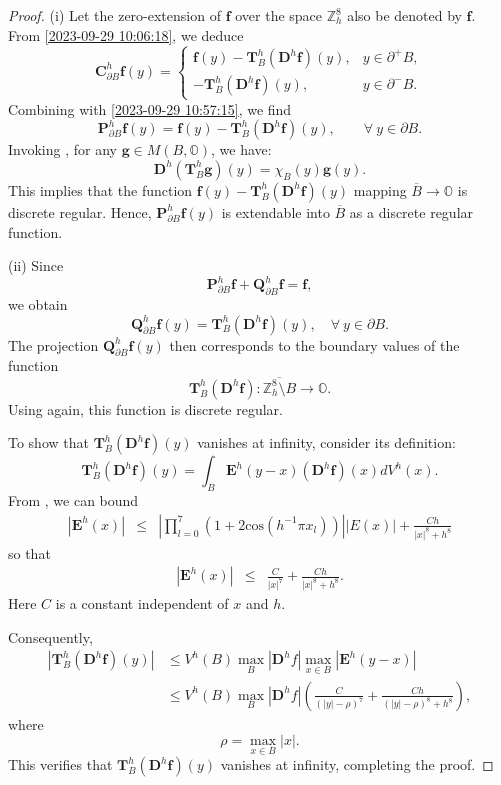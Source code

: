 \documentclass{amsart}
\theoremstyle{definition}
\theoremstyle{remark}
\numberwithin{equation}{section}
\newcommand{\p}{\partial}
\newcommand{\OO}{\mathbb O}
\newcommand{\Z}{\mathbb Z}
\newcommand{\f}{\bm{f}}
\newcommand{\g}{\bm{g}}
\newcommand{\E}{\bm{E}}
\begin{document}
\begin{proof}
(i) 	Let the zero-extension of $\f$ over the space $\Z^8_h$ also be denoted by $\f$. From \eqref{2023-09-29 10:06:18}, we deduce
	\[
	\bm C^h_{\p B}\f(y) =
	\begin{cases}
		\f(y)- \bm T^h_B(\bm D^h \f )(y), & y\in \p^+B, \\
		- \bm T^h_B(\bm D^h \f )(y), & y\in \p^-B.
	\end{cases}
	\]
	Combining with \eqref{2023-09-29 10:57:15}, we find
	\[
	\bm P^h_{\p B}\f(y) = \f(y) - \bm T^h_B(\bm D^h \f )(y), \qquad \forall\ y\in \p B.
	\]
	Invoking , for any $\g\in M(B,\OO)$, we have:
	\[
	\bm D^h(\bm T^h_B \g)(y) = \chi_B(y) \g(y).
	\]
	This implies that the function \(\f(y) - \bm T^h_B(\bm D^h \f )(y)\) mapping \(\overline B \rightarrow \OO\) is discrete regular. Hence, \(\bm P^h_{\p B}\f(y)\) is extendable into \(\overline B\) as a discrete regular function.
	
(ii)  Since
\[
\bm P^h_{\p B} \f + \bm Q^h_{\p B} \f = \f,
\] we obtain
	\[
	\bm Q^h_{\p B} \f(y) = \bm T^h_B(\bm D^h \f )(y),   \quad \forall\   y\in \p B.
	\]
	The projection \(\bm Q^h_{\p B} \f(y)\) then corresponds to the boundary values of the function
	\[
\bm T^h_B(\bm D^h \f ):\overline{\Z^8_h\setminus B} \rightarrow \OO.
\]
	Using  again, this function is discrete regular.
	
	To show that \(\bm T^h_B(\bm D^h \f )(y)\) vanishes at infinity, consider its definition:
	\[
	\bm T^h_B(\bm D^h \f )(y) = \int_B \E^h(y-x)(\bm D^h \f)(x) dV^h(x).
	\]
	From , we can bound
\begin{eqnarray*}
	|\E^h(x)| &\leqslant & \left| \prod_{l=0}^7 (1+2\mbox{cos}(h^{-1} \pi x_l))\right| |E(x)|+ \frac{Ch}{|x|^8+h^8}
 \end{eqnarray*}
so that \begin{eqnarray}\label{estamae-850}
	|\E^h(x)|
	&\leqslant &
	\frac{C}{|x|^7} + \frac{Ch}{|x|^8+h^8}.
\end{eqnarray}
Here $C$ is a constant independent of $x$ and $h$.






	Consequently,
	\[
	\begin{split}
		|\bm T^h_B(\bm D^h \f )(y)| &\leqslant V^h(B) \max_{B} |\bm D^h f| \max_{x\in B} |\E^h(y-x)| \\
		&\leqslant V^h(B) \max_{B} |\bm D^h f| \left( \frac{C}{(|y| -\rho)^7 }+ \frac{Ch}{(|y| -\rho )^8+h^8} \right),
	\end{split}
	\]
	where \[
\rho=\max_{x\in B} |x|.
\]  This verifies that \(\bm T^h_B(\bm D^h \f )(y)\) vanishes at infinity, completing the proof.
\end{proof}
\end{document}
